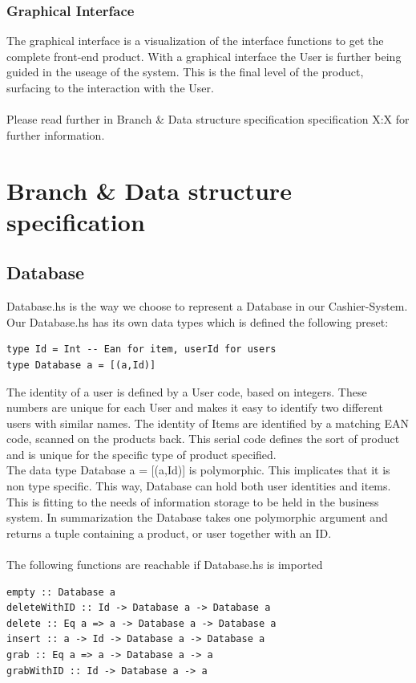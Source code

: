 \documentclass[11pt]{article}
\begin{document}
\subsubsection{Graphical Interface}
The graphical interface is a visualization of the interface functions to get the complete front-end product. With a graphical interface the User is further being guided in the useage of the system. This is the final level of the product, surfacing to the interaction with the User.
\\\\
Please read further in Branch \& Data structure specification specification X:X for further information.
\newpage
\section{Branch \& Data structure specification}
\subsection{Database}
Database.hs is the way we choose to represent a Database in our Cashier-System. Our Database.hs has its own data types which is defined the following preset:
\begin{lstlisting}
type Id = Int -- Ean for item, userId for users
type Database a = [(a,Id)]
\end{lstlisting}

The identity of a user is defined by a User code, based on integers. These numbers are unique for each User and makes  it easy to identify two different users with similar names.
The identity of Items are identified by a matching EAN code, scanned on the products back. This serial code defines the sort of product and is unique for the specific type of product specified.
\\
The data type Database a = [(a,Id)]  is polymorphic. This implicates that it is non type specific.  This way, Database can hold both user identities and items. This is fitting to the needs of information storage to be held in the business system. In summarization the Database takes one polymorphic argument and returns a tuple containing a product, or user together with an ID.
\\\\
The following functions are reachable if Database.hs is imported
\begin{lstlisting}
empty :: Database a
deleteWithID :: Id -> Database a -> Database a
delete :: Eq a => a -> Database a -> Database a
insert :: a -> Id -> Database a -> Database a
grab :: Eq a => a -> Database a -> a
grabWithID :: Id -> Database a -> a
\end{lstlisting}
\end{document}
